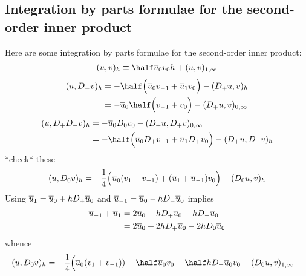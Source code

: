 \clearpage
\newcommand{\Dz}{\widetilde{D}_0}
\subsection{Integration by parts formulae for the second-order inner product}


Here are some integration by parts formulae for the second-order inner product:
\begin{align}
  (u,v)_h  \equiv   \half\ubar_0 v_0 h + (u,v)_{1,\infty}
\end{align}
% 
\begin{align}
  (u, D_- v )_h  &=  -\half\Big( \ubar_0 v_{-1} + \ubar_1 v_0 \Big)  - (D_+ u,v)_h \label{eq:dmip}\\
                 &=  -\ubar_0 \half\Big(v_{-1} + v_0 \Big) - (D_+ u,v)_{0,\infty}
\end{align}
\begin{align}
  (u, D_+D_- v )_h  &= - \ubar_0 D_0 v_0 - (D_+ u, D_+ v)_{0,\infty}  \label{eq:dpdmip} \\
                    &= -\half\Big( \ubar_0 D_+ v_{-1} + \ubar_1 D_+ v_0 \Big)  - (D_+ u, D_+ v)_h 
\end{align}
*check* these
\begin{align}
 (u, D_0 v )_h &= -\frac{1}{4}\Big( \overline{u}_0(v_1+v_{-1}) + (\overline{u}_1+\overline{u}_{-1}) v_0 \Big) 
                      - (D_0 u,v)_h \label{eq:dzip} \\
\end{align}
Using $\overline{u}_{1}=\overline{u}_0 + hD_+\overline{u}_0$ and $\overline{u}_{-1}=\overline{u}_0 - hD_- \overline{u}_0$
implies 
\begin{align*}
\overline{u}_{-1}+\overline{u}_{1} &= 2 \overline{u}_0 + hD_+\overline{u}_0 - hD_- \overline{u}_0 \\
                     &= 2 \overline{u}_0 + 2 h D_+\overline{u}_0 - 2h D_0 \overline{u}_0 
\end{align*}
whence
\begin{align}
 (u, D_0 v )_h &= -\frac{1}{4}\Big( \ubar_0(v_1+v_{-1}) )
                  -\half \ubar_0 v_0 -\half h D_+\ubar_0 v_0 - (D_0 u,v)_{1,\infty}
\end{align}

